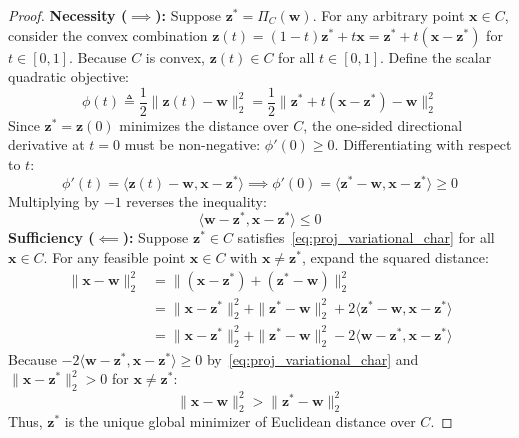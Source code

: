\begin{proof}
\textbf{Necessity ($\implies$):} Suppose $\mathbf{z}^* = \Pi_C(\mathbf{w})$. For any arbitrary point $\mathbf{x} \in C$, consider the convex combination $\mathbf{z}(t) = (1 - t)\mathbf{z}^* + t \mathbf{x} = \mathbf{z}^* + t(\mathbf{x} - \mathbf{z}^*)$ for $t \in [0, 1]$. Because $C$ is convex, $\mathbf{z}(t) \in C$ for all $t \in [0, 1]$. Define the scalar quadratic objective:
\begin{equation}
\phi(t) \triangleq \frac{1}{2}\|\mathbf{z}(t) - \mathbf{w}\|_2^2 = \frac{1}{2}\|\mathbf{z}^* + t(\mathbf{x} - \mathbf{z}^*) - \mathbf{w}\|_2^2
\end{equation}
Since $\mathbf{z}^* = \mathbf{z}(0)$ minimizes the distance over $C$, the one-sided directional derivative at $t = 0$ must be non-negative: $\phi'(0) \ge 0$. Differentiating with respect to $t$:
\begin{equation}
\phi'(t) = \langle \mathbf{z}(t) - \mathbf{w}, \mathbf{x} - \mathbf{z}^* \rangle \implies \phi'(0) = \langle \mathbf{z}^* - \mathbf{w}, \mathbf{x} - \mathbf{z}^* \rangle \ge 0
\end{equation}
Multiplying by $-1$ reverses the inequality:
\begin{equation}
\langle \mathbf{w} - \mathbf{z}^*, \mathbf{x} - \mathbf{z}^* \rangle \le 0
\end{equation}
\textbf{Sufficiency ($\impliedby$):} Suppose $\mathbf{z}^* \in C$ satisfies~\eqref{eq:proj_variational_char} for all $\mathbf{x} \in C$. For any feasible point $\mathbf{x} \in C$ with $\mathbf{x} \ne \mathbf{z}^*$, expand the squared distance:
\begin{align}
\|\mathbf{x} - \mathbf{w}\|_2^2 &= \|(\mathbf{x} - \mathbf{z}^*) + (\mathbf{z}^* - \mathbf{w})\|_2^2 \nonumber \\
&= \|\mathbf{x} - \mathbf{z}^*\|_2^2 + \|\mathbf{z}^* - \mathbf{w}\|_2^2 + 2\langle \mathbf{z}^* - \mathbf{w}, \mathbf{x} - \mathbf{z}^* \rangle \nonumber \\
&= \|\mathbf{x} - \mathbf{z}^*\|_2^2 + \|\mathbf{z}^* - \mathbf{w}\|_2^2 - 2\langle \mathbf{w} - \mathbf{z}^*, \mathbf{x} - \mathbf{z}^* \rangle
\end{align}
Because $-2\langle \mathbf{w} - \mathbf{z}^*, \mathbf{x} - \mathbf{z}^* \rangle \ge 0$ by~\eqref{eq:proj_variational_char} and $\|\mathbf{x} - \mathbf{z}^*\|_2^2 > 0$ for $\mathbf{x} \ne \mathbf{z}^*$:
\begin{equation}
\|\mathbf{x} - \mathbf{w}\|_2^2 > \|\mathbf{z}^* - \mathbf{w}\|_2^2
\end{equation}
Thus, $\mathbf{z}^*$ is the unique global minimizer of Euclidean distance over $C$.
\end{proof}

